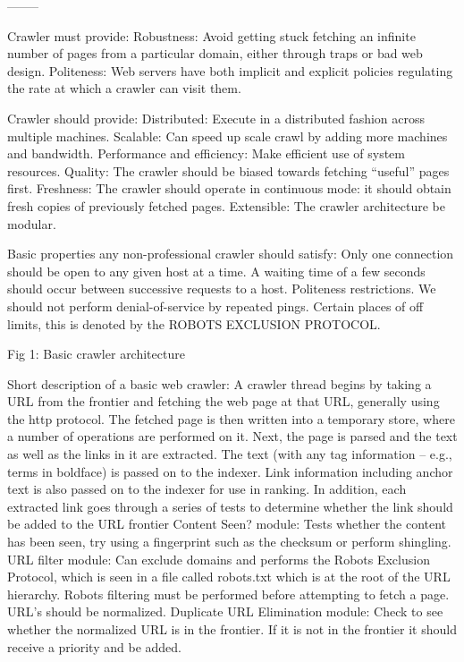 




--------

Crawler must provide:
Robustness: Avoid getting stuck fetching an infinite number of pages from a particular domain, either through traps or bad web design.
Politeness: Web servers have both implicit and explicit policies regulating the rate at which a crawler can visit them. 

Crawler should provide:
Distributed: Execute in a distributed fashion across multiple machines.
Scalable: Can speed up scale crawl by adding more machines and bandwidth.
Performance and efficiency: Make efficient use of system resources. 
Quality: The crawler should be biased towards fetching “useful” pages first.
Freshness: The crawler should operate in continuous mode: it should obtain fresh copies of previously fetched pages.
Extensible: The crawler architecture be modular.

Basic properties any non-professional crawler should satisfy:
 Only one connection should be open to any given host at a time.
 A waiting time of a few seconds should occur between successive requests to a host.
Politeness restrictions. We should not perform denial-of-service by repeated pings. Certain places of off limits, this is denoted by the ROBOTS EXCLUSION PROTOCOL.

Fig 1: Basic crawler architecture

Short description of a basic web crawler:
A crawler thread begins by taking a URL from the frontier and fetching the web page at that URL, generally using the http protocol. The fetched page is then written into a temporary store, where a number of operations are performed on it. Next, the page is parsed and the text as well as the links in it are extracted. The text (with any tag information – e.g., terms in boldface) is passed on to the indexer. Link information including anchor text is also passed on to the indexer for use in ranking. In addition, each extracted link goes through a series of tests to determine whether the link should be added to the URL frontier
Content Seen? module: Tests whether the content has been seen, try using a fingerprint such as the checksum or perform shingling.
URL filter module: Can exclude domains and performs the Robots Exclusion Protocol, which is seen in a file called robots.txt which is at the root of the URL hierarchy. Robots filtering must be performed before attempting to fetch a page. URL’s should be normalized. 
Duplicate URL Elimination module: Check to see whether the normalized URL is in the frontier. If it is not in the frontier it should receive a priority and be added.


